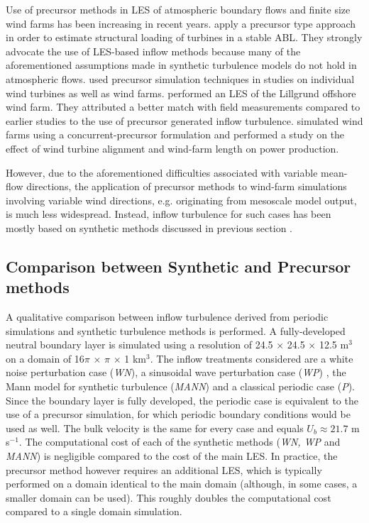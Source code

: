	Use of precursor methods  in LES of atmospheric boundary flows and finite size wind farms has been increasing in recent years. \cite{park2014large} apply a precursor type approach in order to estimate structural loading of turbines in a stable ABL. They strongly advocate the use of LES-based inflow methods because many of the aforementioned assumptions made in synthetic turbulence models do not hold in atmospheric flows.
	\cite{wu2011large, wu2012atmospheric, wu2013simulation,  wu2015modeling} used precursor simulation techniques in studies on individual wind turbines as well as wind farms.
	\cite{churchfield2012large} performed an LES of the Lillgrund offshore wind farm. They attributed a better match with field measurements compared to earlier studies to the use of precursor generated inflow turbulence. \cite{stevens2014large, stevens2014concurrent} simulated wind farms using a concurrent-precursor formulation and performed a study on the effect of wind turbine alignment and wind-farm length on power production.  
	
	However, due to the aforementioned difficulties associated with variable mean-flow directions, the application of precursor methods to wind-farm simulations involving variable wind directions, e.g. originating from mesoscale model output, is much less widespread. Instead, inflow turbulence for such cases has been mostly based on synthetic methods discussed in previous section \citep{mirocha2013transition, mirocha2014resolved, munoz2015stochastic}.
	
	
	\subsection{Comparison between Synthetic and Precursor methods}\label{subsec:comparison}
	A qualitative comparison between inflow turbulence derived from periodic simulations and synthetic turbulence methods is performed. A fully-developed neutral boundary layer is simulated using a resolution of 24.5 $\times$ 24.5 $\times$ 12.5 m$^3$ on a domain of 16$\pi$ $\times$ $\pi$ $\times$ 1 km$^3$. The inflow treatments considered are a white noise perturbation case  (\emph{WN}), a sinusoidal wave perturbation case (\emph{WP}) , the Mann model for synthetic turbulence (\emph{MANN}) and a classical periodic case (\emph{P}). Since the boundary layer is fully developed, the periodic case is equivalent to the use of a precursor simulation, for which periodic boundary conditions would be used as well. The bulk velocity is the same for every case and equals $U_b \approx 21.7 $ m s$^{-1}$. The computational cost of each of the synthetic methods (\emph{WN, WP} and \emph{MANN}) is negligible compared to the cost of the main LES. In practice, the precursor method however requires an additional LES, which is typically performed on a domain identical to the main domain (although, in some cases, a smaller domain can be used). This roughly doubles the computational cost compared to a single domain simulation.
	

